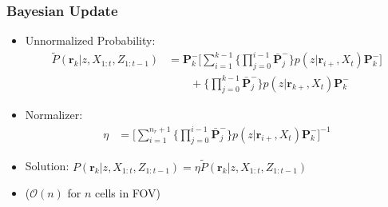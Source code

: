 \documentclass[11pt,professionalfonts,hyperref={pdftex,pdfpagemode=none,pdfstartview=FitH}]{beamer}
\renewcommand{\emph}[1]{\textit{\textbf{\color{blue}{#1}}}}
\begin{document}
\begin{frame}
\frametitle{Bayesian Update}

\begin{itemize}
	\item Unnormalized Probability:
	\begin{align*}
\tilde P(\mathbf{r}_{k}|z,X_{1:t},Z_{1:t-1})
&=\mathbf{P}_k^-
\bigg[\sum_{i=1}^{k-1}\bigg\{\prod_{j=0}^{i-1}\bar{\mathbf{P}}_j^-\bigg\}p(z|\mathbf{r}_{i+},X_t)\mathbf{P}_k^-\bigg]\nonumber\\
&\qquad + \bigg\{\prod_{j=0}^{k-1}\bar{\mathbf{P}}_j^-\bigg\}p(z|\mathbf{r}_{k+},X_t)\mathbf{P}_k^-
\end{align*}
	\item Normalizer:
	\begin{align*}
\label{eqn:allEta}
\eta
&=
\bigg[\sum_{i=1}^{n_{r}+1}\bigg\{\prod_{j=0}^{i-1}\bar{\mathbf{P}}_j^-\bigg\} p(z|\mathbf{r}_{i+},X_t)\mathbf{P}_k^-\bigg]^{-1}
\end{align*}
	\item Solution: $P(\mathbf{r}_{k}|z,X_{1:t},Z_{1:t-1})=\eta\tilde P(\mathbf{r}_{k}|z,X_{1:t},Z_{1:t-1})$
	\item \emph{Linear Complexity} ($\mathcal{O}(n)$ for \emph{all} $n$ cells in FOV)
\end{itemize}
\end{frame}

\end{document}
